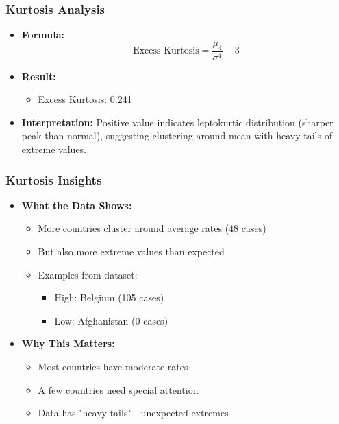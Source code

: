 \begin{frame}
    \frametitle{Kurtosis Analysis}
    \begin{itemize}
        \item \textbf{Formula:}
        \[
        \text{Excess Kurtosis} = \frac{\mu_4}{\sigma^4} - 3
        \]
        
        \item \textbf{Result:}
        \begin{itemize}
            \item Excess Kurtosis: 0.241
        \end{itemize}
        
        \item \textbf{Interpretation:} Positive value indicates leptokurtic distribution (sharper peak than normal), suggesting clustering around mean with heavy tails of extreme values.
    \end{itemize}
\end{frame}

\begin{frame}
    \frametitle{Kurtosis Insights}
    \begin{itemize}
        \item \textbf{What the Data Shows:}
        \begin{itemize}
            \item More countries cluster around average rates (48 cases) 
            \item But also more extreme values than expected
            \item Examples from dataset:
                \begin{itemize}
                    \item High: Belgium (105 cases)
                    \item Low: Afghanistan (0 cases)
                \end{itemize}
        \end{itemize}
        
        \item \textbf{Why This Matters:}
        \begin{itemize}
            \item Most countries have moderate rates
            \item A few countries need special attention
            \item Data has "heavy tails" - unexpected extremes
        \end{itemize}
    \end{itemize}
\end{frame}

